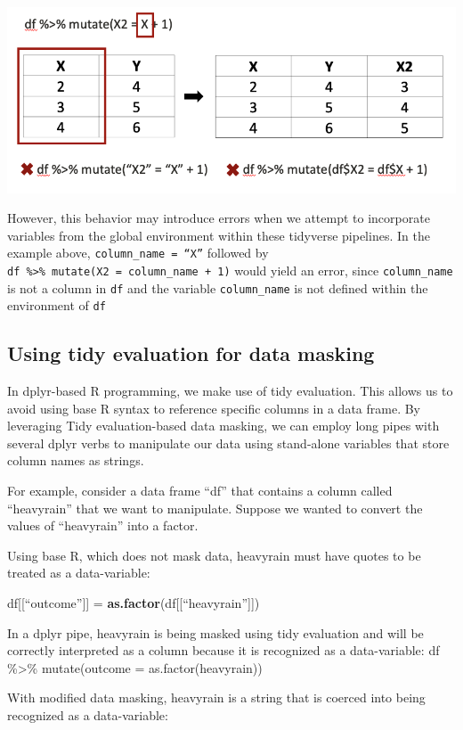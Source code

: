 \documentclass[
]{book}
\newenvironment{Shaded}{\begin{snugshade}}{\end{snugshade}}
\newcommand{\FunctionTok}[1]{\textcolor[rgb]{0.13,0.29,0.53}{\textbf{#1}}}
\newcommand{\NormalTok}[1]{#1}
\newcommand{\OtherTok}[1]{\textcolor[rgb]{0.56,0.35,0.01}{#1}}
\begin{document}
\includegraphics[width=0.5\linewidth]{assets/images/data-masking}

However, this behavior may introduce errors when we attempt to incorporate variables from the global environment within these tidyverse pipelines. In the example above, \texttt{column\_name\ =\ “X”} followed by \texttt{df\ \%\textgreater{}\%\ mutate(X2\ =\ column\_name\ +\ 1)} would yield an error, since \texttt{column\_name} is not a column in \texttt{df} and the variable \texttt{column\_name} is not defined within the environment of \texttt{df}

\subsection{Using tidy evaluation for data masking}\label{using-tidy-evaluation-for-data-masking}

In dplyr-based R programming, we make use of tidy evaluation. This allows us to avoid using base R syntax to reference specific columns in a data frame. By leveraging Tidy evaluation-based data masking, we can employ long pipes with several dplyr verbs to manipulate our data using stand-alone variables that store column names as strings.

For example, consider a data frame ``df'' that contains a column called ``heavyrain'' that we want to manipulate. Suppose we wanted to convert the values of ``heavyrain'' into a factor.

Using base R, which does not mask data, heavyrain must have quotes to be treated as a data-variable:

\begin{Shaded}
\begin{Highlighting}[]
\NormalTok{df[[“outcome”]] }\OtherTok{=} \FunctionTok{as.factor}\NormalTok{(df[[“heavyrain”]])}
\end{Highlighting}
\end{Shaded}

In a dplyr pipe, heavyrain is being masked using tidy evaluation and will be correctly interpreted as a column because it is recognized as a data-variable:
df \%\textgreater\% mutate(outcome = as.factor(heavyrain))

With modified data masking, heavyrain is a string that is coerced into being recognized as a data-variable:
\end{document}
